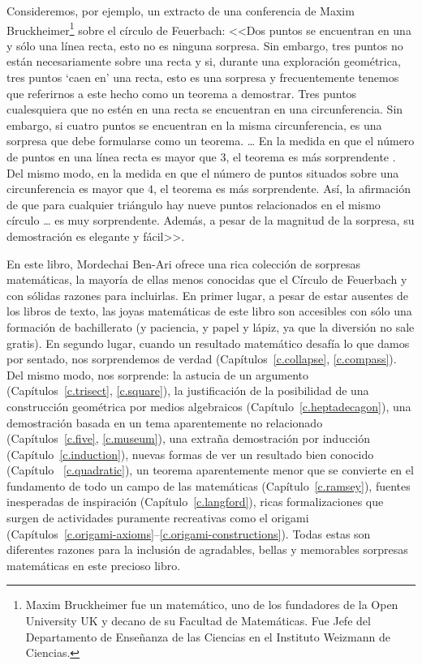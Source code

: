 Consideremos, por ejemplo, un extracto de una conferencia de Maxim Bruckheimer\footnote{Maxim Bruckheimer fue un matemático, uno de los fundadores de la Open University UK y decano de su Facultad de Matemáticas. Fue Jefe del Departamento de Enseñanza de las Ciencias en el Instituto Weizmann de Ciencias.} sobre el círculo de Feuerbach: <<Dos puntos se encuentran en una y sólo una línea recta, esto no es ninguna sorpresa. Sin embargo, tres puntos no están necesariamente sobre una recta y si, durante una exploración geométrica, tres puntos `caen en' una recta, esto es una sorpresa y frecuentemente tenemos que referirnos a este hecho como un teorema a demostrar. Tres puntos cualesquiera que no estén en una recta se encuentran en una circunferencia. Sin embargo, si cuatro puntos se encuentran en la misma circunferencia, es una sorpresa que debe formularse como un teorema. \ldots{} En la medida en que el número de puntos en una línea recta es mayor que $3$, el teorema es más sorprendente . Del mismo modo, en la medida en que el número de puntos situados sobre una circunferencia es mayor que $4$, el teorema es más sorprendente. Así, la afirmación de que para cualquier triángulo hay nueve puntos relacionados en el mismo círculo \ldots{} es muy sorprendente. Además, a pesar de la magnitud de la sorpresa, su demostración es elegante y fácil>>.

En este libro, Mordechai Ben-Ari ofrece una rica colección de sorpresas matemáticas, la mayoría de ellas menos conocidas que el Círculo de Feuerbach y con sólidas razones para incluirlas. En primer lugar, a pesar de estar ausentes de los libros de texto, las joyas matemáticas de este libro son accesibles con sólo una formación de bachillerato (y paciencia, y papel y lápiz, ya que la diversión no sale gratis). En segundo lugar, cuando un resultado matemático desafía lo que damos por sentado, nos sorprendemos de verdad (Capítulos~\ref{c.collapse}, \ref{c.compass}). Del mismo modo, nos sorprende: la astucia de un argumento (Capítulos~\ref{c.trisect}, \ref{c.square}), la justificación de la posibilidad de una construcción geométrica por medios algebraicos (Capítulo~\ref{c.heptadecagon}), una demostración basada en un tema aparentemente no relacionado (Capítulos~\ref{c.five}, \ref{c.museum}), una extraña demostración por inducción (Capítulo~\ref{c.induction}), nuevas formas de ver un resultado bien conocido (Capítulo ~\ref{c.quadratic}), un teorema aparentemente menor que se convierte en el fundamento de todo un campo de las matemáticas (Capítulo~\ref{c.ramsey}), fuentes inesperadas de inspiración (Capítulo~\ref{c.langford}), ricas formalizaciones que surgen de actividades puramente recreativas como el origami (Capítulos~\ref{c.origami-axioms}--\ref{c.origami-constructions}). Todas estas son diferentes razones para la inclusión de agradables, bellas y memorables sorpresas matemáticas en este precioso libro.
   
